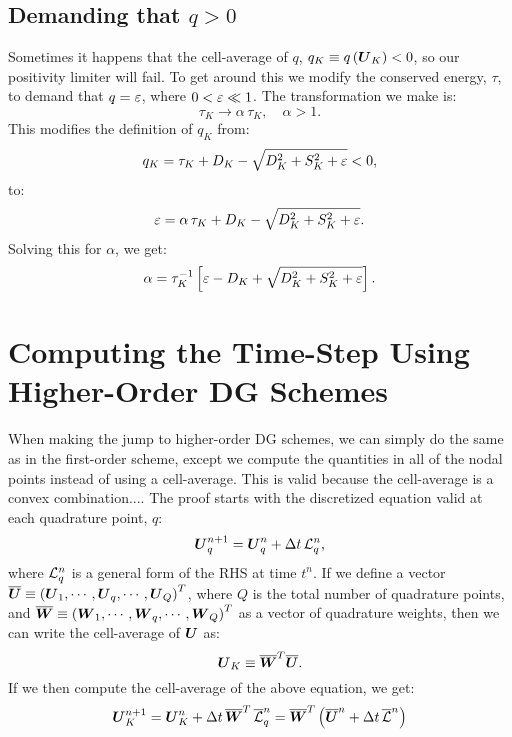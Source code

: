 \documentclass[10pt,preprint]{aastex}
\begin{document}
\subsection{Demanding that $q>0$}

Sometimes it happens that the cell-average of $q$, $q_{K}\equiv q\left(\boldsymbol{U}_{K}\right)<0$, so our positivity limiter will fail. To get around this we modify the conserved energy, $\tau$, to demand that $q=\varepsilon$, where $0<\varepsilon\ll1$. The transformation we make is:
\begin{equation}
   \tau_{K}\longrightarrow\alpha\,\tau_{K},\hspace{1em}\alpha>1.
\end{equation}
This modifies the definition of $q_{K}$ from:
\begin{equation}
   q_{K}=\tau_{K}+D_{K}-\sqrt{D_{K}^{2}+S_{K}^{2}+\varepsilon}<0,
\end{equation}
to:
\begin{equation}
   \varepsilon=\alpha\,\tau_{K}+D_{K}-\sqrt{D_{K}^{2}+S_{K}^{2}+\varepsilon}.
\end{equation}
Solving this for $\alpha$, we get:
\begin{equation}
   \alpha=\tau_{K}^{-1}\left[\varepsilon-D_{K}+\sqrt{D_{K}^{2}+S_{K}^{2}+\varepsilon}\right].
\end{equation}

\section{Computing the Time-Step Using Higher-Order DG Schemes}

When making the jump to higher-order DG schemes, we can simply do the same as in the first-order scheme, except we compute the quantities in all of the nodal points instead of using a cell-average. This is valid because the cell-average is a convex combination.... The proof starts with the discretized equation valid at each quadrature point, $q$:
\begin{equation}
    \boldsymbol{U}_{q}^{n+1}=\boldsymbol{U}_{q}^{n}+\Delta t\,\mathcal{L}_{q}^{n},
\end{equation}
where $\mathcal{L}_{q}^{n}$ is a general form of the RHS at time $t^{n}$. If we define a vector $\overline{\boldsymbol{U}}\equiv\left(\boldsymbol{U}_{1},\cdots,\boldsymbol{U}_{q},\cdots,\boldsymbol{U}_{Q}\right)^T$, where $Q$ is the total number of quadrature points, and $\overline{\boldsymbol{W}}\equiv\left(\boldsymbol{W}_{1},\cdots,\boldsymbol{W}_{q},\cdots,\boldsymbol{W}_{Q}\right)^T$ as a vector of quadrature weights, then we can write the cell-average of $\boldsymbol{U}$ as:
\begin{equation}
    \boldsymbol{U}_{K}\equiv\overline{\boldsymbol{W}}^T\overline{\boldsymbol{U}}.
\end{equation}
If we then compute the cell-average of the above equation, we get:
\begin{equation}
    \boldsymbol{U}_{K}^{n+1}=\boldsymbol{U}_{K}^{n}+\Delta t\,\overline{\boldsymbol{W}}^{T}\,\overline{\mathcal{L}}_{q}^{n}=\overline{\boldsymbol{W}}^{T}\left(\overline{\boldsymbol{U}}^{n}+\Delta t\,\overline{\mathcal{L}}^{n}\right)
\end{equation}
\end{document}
